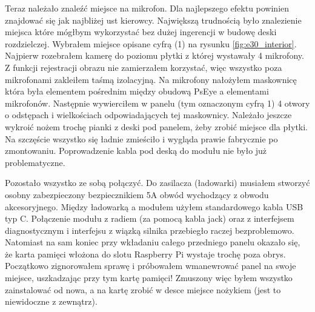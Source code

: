 \documentclass[declaration,shortabstract, inz]{iithesis}
\begin{document}
    Teraz należało znaleźć miejsce na mikrofon. Dla najlepszego efektu powinien znajdować się jak najbliżej ust kierowcy. Największą trudnością było znalezienie miejsca które mógłbym wykorzystać bez dużej ingerencji w budowę deski rozdzielczej. Wybrałem miejsce opisane cyfrą (1) na rysunku \ref{fig:e30_interior}. Najpierw rozebrałem kamerę do poziomu płytki z której wystawały 4 mikrofony. Z funkcji rejestracji obrazu nie zamierzałem korzystać, więc wszystko poza mikrofonami zakleiłem taśmą izolacyjną. Na mikrofony nałożyłem maskownicę która była elementem pośrednim między obudową PsEye a elementami mikrofonów. Następnie wywierciłem w panelu (tym oznaczonym cyfrą 1) 4 otwory o odstępach i wielkościach odpowiadających tej maskownicy. Należało jeszcze wykroić nożem trochę pianki z deski pod panelem, żeby zrobić miejsce dla płytki. Na szczęście wszystko się ładnie zmieściło i wygląda prawie fabrycznie po zmontowaniu. Poprowadzenie kabla pod deską do modułu nie było już problematyczne.
    
    Pozostało wszystko ze sobą połączyć. Do zasilacza (ładowarki) musiałem stworzyć osobny zabezpieczony bezpiecznikiem 5A obwód wychodzący z obwodu akcesoryjnego. Między ładowarką a modułem użyłem standardowego kabla USB typ C. Połączenie modułu z radiem (za pomocą kabla jack) oraz z interfejsem diagnostycznym i interfejsu z wiązką silnika przebiegło raczej bezproblemowo. Natomiast na sam koniec przy wkładaniu całego przedniego panelu okazało się, że karta pamięci włożona do slotu Raspberry Pi wystaje trochę poza obrys. Początkowo zignorowałem sprawę i próbowałem wmanewrować panel na swoje miejsce, uszkadzając przy tym kartę pamięci! Zmuszony więc byłem wszystko zainstalować od nowa, a na kartę zrobić w desce miejsce nożykiem (jest to niewidoczne z zewnątrz).
    
    
\end{document}
